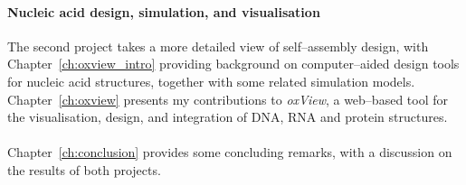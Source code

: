 \paragraph{Nucleic acid design, simulation, and visualisation}
The second project takes a more detailed view of self--assembly design, with Chapter~\ref{ch:oxview_intro} providing background on computer--aided design tools for nucleic acid structures, together with some related simulation models. Chapter~\ref{ch:oxview} presents my contributions to \emph{oxView}, a web--based tool for the visualisation, design, and integration of DNA, RNA and protein structures.

\paragraph{}
Chapter~\ref{ch:conclusion} provides some concluding remarks, with a discussion on the results of both projects.



